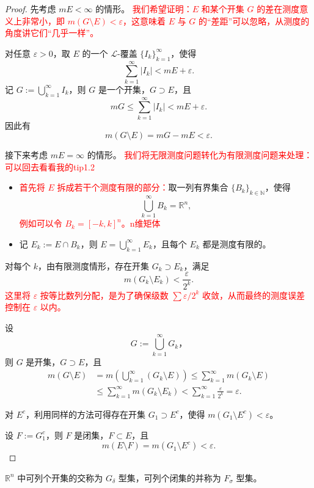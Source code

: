 \documentclass[lang=cn,10pt]{elegantbook}
\begin{document}
\begin{proof}
先考虑 $mE < \infty$ 的情形。
\textcolor{red}{我们希望证明：$E$ 和某个开集 $G$ 的差在测度意义上非常小，即 $m(G \setminus E) < \varepsilon$，这意味着 $E$ 与 $G$ 的“差距”可以忽略，从测度的角度讲它们“几乎一样”。}

对任意 $\varepsilon > 0$，取 $E$ 的一个 $\mathcal{L}$-覆盖 $\{I_k\}_{k=1}^\infty$，使得
\[
\sum_{k=1}^\infty |I_k| < mE + \varepsilon.
\]
记 $G := \bigcup_{k=1}^\infty I_k$，则 $G$ 是一个开集，$G \supset E$，且
\[
mG \leq \sum_{k=1}^\infty |I_k| < mE + \varepsilon.
\]
因此有
\[
m(G \setminus E) = mG - mE < \varepsilon.
\]

\vspace{1em}
接下来考虑 $mE = \infty$ 的情形。
\textcolor{red}{我们将无限测度问题转化为有限测度问题来处理：可以回去看看我的tip1.2}

\begin{itemize}
  \item 
  \textcolor{red}{首先将 $E$ 拆成若干个测度有限的部分：}取一列有界集合 $\{B_k\}_{k \in \mathbb{N}}$，使得
  \[
  \bigcup_{k=1}^\infty B_k = \mathbb{R}^n,
  \]
  \textcolor{red}{例如可以令 $B_k = [-k, k]^n$。n维矩体}
  
  \item 记 $E_k := E \cap B_k$，则 $E = \bigcup_{k=1}^\infty E_k$，且每个 $E_k$ 都是测度有限的。
\end{itemize}

对每个 $k$，由有限测度情形，存在开集 $G_k \supset E_k$，满足
\[
m(G_k \setminus E_k) < \frac{\varepsilon}{2^k}.
\]
\textcolor{red}{这里将 $\varepsilon$ 按等比数列分配，是为了确保级数 $\sum \varepsilon/2^k$ 收敛，从而最终的测度误差控制在 $\varepsilon$ 以内。}

设
\[
G := \bigcup_{k=1}^\infty G_k，
\]
则 $G$ 是开集，$G \supset E$，且
\[
\begin{aligned}
m(G \setminus E)
&= m\left( \bigcup_{k=1}^\infty (G_k \setminus E) \right)
\leq \sum_{k=1}^\infty m(G_k \setminus E) \\
&\leq \sum_{k=1}^\infty m(G_k \setminus E_k)
< \sum_{k=1}^\infty \frac{\varepsilon}{2^k} = \varepsilon.
\end{aligned}
\]

对 $E^c$，利用同样的方法可得存在开集 $G_1 \supset E^c$，使得 $m(G_1 \setminus E^c) < \varepsilon$。

设 $F := G_1^c$，则 $F$ 是闭集，$F \subset E$，且
\[
m(E \setminus F) = m(G_1 \setminus E^c) < \varepsilon.
\]
\end{proof}
\begin{definition}
$\mathbb{R}^n$ 中可列个开集的交称为 $G_\delta$ 型集，可列个闭集的并称为 $F_\sigma$ 型集。
\end{definition}
\end{document}
